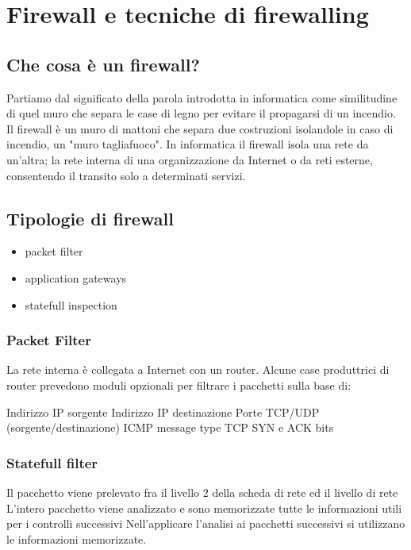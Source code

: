 \chapter{Firewall e tecniche di firewalling}  %

\section{Che cosa è un firewall? }
Partiamo dal significato della parola introdotta in informatica come similitudine di quel muro che separa le case di legno per evitare il propagarsi di un incendio.
Il firewall è un muro di mattoni che separa due costruzioni isolandole in caso di incendio, un "muro tagliafuoco". In informatica il firewall isola una rete da un'altra; la rete interna di una organizzazione da Internet o da reti esterne, consentendo il transito solo a determinati servizi.

\section{Tipologie di firewall}

\begin{itemize}
    \item packet filter
    \item application gateways
    \item statefull inspection
\end{itemize}

\subsection{Packet Filter}

La rete interna è collegata a Internet con un router.
Alcune case produttrici di router prevedono moduli opzionali per filtrare i pacchetti sulla base di:

Indirizzo IP sorgente
Indirizzo IP destinazione
Porte TCP/UDP (sorgente/destinazione)
ICMP message type
TCP SYN e ACK bits

\subsection{ Statefull filter}

Il pacchetto viene prelevato fra il livello 2 della scheda di rete ed il livello di rete
L’intero pacchetto viene analizzato e sono memorizzate tutte le informazioni utili per i controlli successivi
Nell’applicare l’analisi ai pacchetti successivi si utilizzano le informazioni memorizzate.
 

